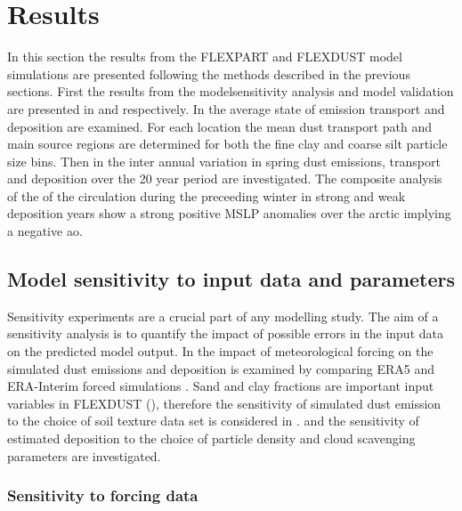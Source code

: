 \chapter{Results}
In this section the results from the FLEXPART and FLEXDUST model simulations are presented following the methods described in the previous sections. First the results from the modelsensitivity analysis and model validation are presented in  and  respectively. 
In   the average state of emission transport and deposition are examined. For each location the mean dust transport path and main source regions are determined for both the fine clay and coarse silt particle size bins. 
Then in  the inter annual variation in spring dust emissions, transport and deposition over the 20 year period are investigated. The composite analysis of the of the circulation during the preceeding winter in strong and weak deposition years show a strong positive MSLP anomalies over the arctic implying a negative \acrshort{ao}.   

\section{Model sensitivity to input data and parameters}\label{sec:sensitvity_experiment}
Sensitivity experiments are a crucial part of any modelling study. The aim of a sensitivity analysis is to quantify the impact of possible errors in the input data on the predicted model output. 
In  the impact of meteorological forcing on the simulated dust emissions and deposition is examined by comparing ERA5 and ERA-Interim forced simulations
. Sand and clay fractions are important input variables in FLEXDUST (), therefore the sensitivity of simulated dust emission to the choice of soil texture data set is considered in .  and  the sensitivity of estimated deposition to the choice of particle density and cloud scavenging parameters are investigated. 
\subsection{Sensitivity to forcing data}\label{sec:sens_forcing}

